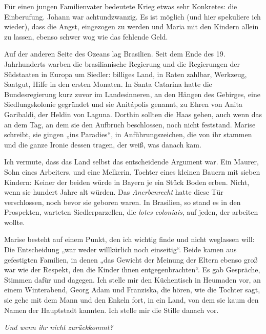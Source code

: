 \documentclass[
  ngerman,
  11pt,
  openany]{book}
\begin{document}
Für einen jungen Familienvater bedeutete Krieg etwas sehr Konkretes: die
Einberufung. Johann war achtundzwanzig. Es ist möglich (und hier
spekuliere ich wieder), dass die Angst, eingezogen zu werden und Maria
mit den Kindern allein zu lassen, ebenso schwer wog wie das fehlende
Geld.

Auf der anderen Seite des Ozeans lag Brasilien. Seit dem Ende des 19.
Jahrhunderts warben die brasilianische Regierung und die Regierungen der
Südstaaten in Europa um Siedler: billiges Land, in Raten zahlbar,
Werkzeug, Saatgut, Hilfe in den ersten Monaten. In Santa Catarina hatte
die Bundesregierung kurz zuvor im Landesinneren, an den Hängen des
Gebirges, eine Siedlungskolonie gegründet und sie Anitápolis genannt, zu
Ehren von Anita Garibaldi, der Heldin von Laguna. Dorthin sollten die
Haas gehen, auch wenn das an dem Tag, an dem sie den Aufbruch
beschlossen, noch nicht feststand. Marise schreibt, sie gingen „ins
Paradies``, in Anführungszeichen, die von ihr stammen und die ganze
Ironie dessen tragen, der weiß, was danach kam.

Ich vermute, dass das Land selbst das entscheidende Argument war. Ein
Maurer, Sohn eines Arbeiters, und eine Melkerin, Tochter eines kleinen
Bauern mit sieben Kindern: Keiner der beiden würde in Bayern je ein
Stück Boden erben. Nicht, wenn sie hundert Jahre alt würden. Das
\emph{Anerbenrecht} hatte diese Tür verschlossen, noch bevor sie geboren
waren. In Brasilien, so stand es in den Prospekten, warteten
Siedlerparzellen, die \emph{lotes coloniais}, auf jeden, der arbeiten
wollte.

Marise besteht auf einem Punkt, den ich wichtig finde und nicht
weglassen will: Die Entscheidung „war weder willkürlich noch
einseitig``. Beide kamen aus gefestigten Familien, in denen „das Gewicht
der Meinung der Eltern ebenso groß war wie der Respekt, den die Kinder
ihnen entgegenbrachten``. Es gab Gespräche, Stimmen dafür und dagegen.
Ich stelle mir den Küchentisch in Heumaden vor, an einem Winterabend,
Georg Adam und Franziska, die hören, wie die Tochter sagt, sie gehe mit
dem Mann und den Enkeln fort, in ein Land, von dem sie kaum den Namen
der Hauptstadt kannten. Ich stelle mir die Stille danach vor.

\emph{Und wenn ihr nicht zurückkommt?}
\end{document}
